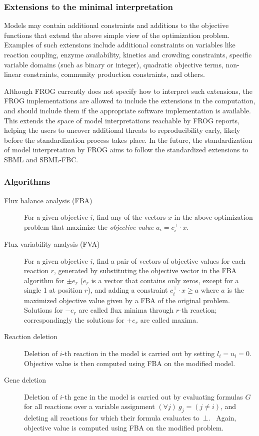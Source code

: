 \subsubsection{Extensions to the minimal interpretation}

Models may contain additional constraints and additions to the objective functions that extend the above simple view of the optimization problem.
Examples of such extensions include additional constraints on variables like reaction coupling, enzyme availability, kinetics and crowding constraints, specific variable domains (such as binary or integer), quadratic objective terms, non-linear constraints, community production constraints, and others.

Although FROG currently does not specify how to interpret such extensions, the FROG implementations are allowed to include the extensions in the computation, and should include them if the appropriate software implementation is available.
This extends the space of model interpretations reachable by FROG reports, helping the users to uncover additional threats to reproducibility early, likely before the standardization process takes place.
In the future, the standardization of model interpretation by FROG aims to follow the standardized extensions to SBML and SBML-FBC.~\cite{keating2020sbml,olivier2018sbmlfbc}

\subsubsection{Algorithms}

\begin{description}
\item[Flux balance analysis (FBA)] For a given objective $i$, find any of the vectors $x$ in the above optimization problem that maximize the \emph{objective value} $a_i = c_i^\intercal \cdot x$.

\item[Flux variability analysis (FVA)] For a given objective $i$, find a pair of vectors of objective values for each reaction $r$, generated by substituting the objective vector in the FBA algorithm for $\pm e_r$ ($e_r$ is a vector that contains only zeros, except for a single 1 at position $r$), and adding a constraint $c_i^\intercal\cdot x \geq a$ where $a$ is the maximized objective value given by a FBA of the original problem.
Solutions for $-e_r$ are called flux minima through $r$-th reaction; correspondingly the solutions for $+e_r$ are called maxima.

\item[Reaction deletion] Deletion of $i$-th reaction in the model is carried out by setting $l_i = u_i = 0$.
Objective value is then computed using FBA on the modified model.

\item[Gene deletion] Deletion of $i$-th gene in the model is carried out by evaluating formulas $G$ for all reactions over a variable assignment $(\forall j)\ g_j = (j \neq i)$, and deleting all reactions for which their formula evaluates to~$\bot$.~\cite{palsson2015systems}
Again, objective value is computed using FBA on the modified problem.
\end{description}

